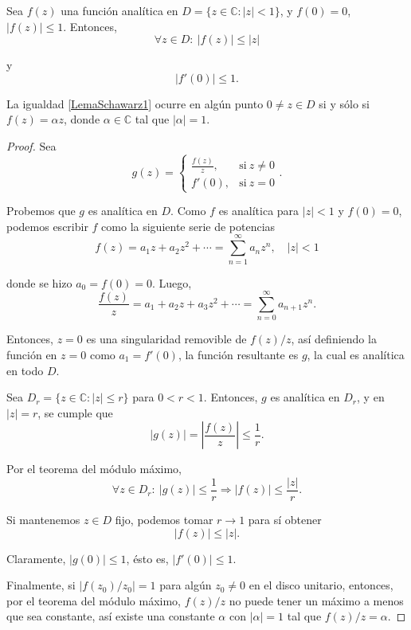 \begin{lema}[de Schwarz]
Sea $f(z)$ una función analítica en  $D = \{z \in \mathbb{C}: |z| < 1 \}$, y $f(0) = 0$, $|f(z)| \leq 1$. Entonces, 
\begin{equation}
 \forall z \in D:~ |f(z)| \leq |z|   \label{LemaSchawarz1}
\end{equation}

y
\begin{equation}
 |f'(0)| \leq 1. \label{LemaSchawarz2}
\end{equation}

La igualdad \eqref{LemaSchawarz1} ocurre en algún punto $0 \neq z \in D$ si y sólo si $f(z) =  \alpha z$, donde $\alpha \in \mathbb{C}$ tal que $|\alpha| = 1$.
\end{lema}
\begin{proof}

Sea 
$$g(z) = \left\{ \begin{array}{cl}
    \frac{f(z)}{z}, & \mbox{si}~ z\neq 0  \\
    f'(0), & \mbox{si}~ z = 0 
\end{array} \right. .$$

Probemos que $g$ es analítica en $D$. Como $f$ es analítica para  $|z| < 1$ y $f(0) = 0$, podemos escribir $f$ como la siguiente serie de potencias
$$f(z) = a_1z + a_2 z^2 + \cdots = \sum_{n=1}^{\infty} a_n z^n, \quad |z| < 1 $$

donde se hizo $a_0 = f(0) = 0$. Luego,
$$\frac{f(z)}{z} = a_1 + a_2 z + a_3 z^2 + \cdots = \sum_{n=0}^{\infty} a_{n+1} z^n.$$

Entonces, $z = 0$ es una singularidad removible de $f(z)/z$, así definiendo la función en $z = 0$ como $a_1 = f'(0)$, la función resultante es $g$, la cual es analítica en todo $D$. 

Sea $D_r = \{z \in \mathbb{C} : |z| \leq r\}$ para $0 <r <1$. Entonces, $g$ es analítica en $D_r$, y en $|z| = r$, se cumple que
$$|g(z)| = \left| \frac{f(z)}{z} \right| \leq \frac{1}{r}.$$

Por el teorema del módulo máximo,
$$\forall z \in D_r: ~ |g(z)| \leq \frac{1}{r} \Rightarrow |f(z)| \leq \frac{|z|}{r}.$$

Si mantenemos $z \in D$ fijo, podemos tomar  $r \to 1$ para sí obtener
$$|f(z)| \leq |z|.$$

Claramente, $|g(0)| \leq 1$, ésto es, $|f'(0)| \leq 1$.

Finalmente, si $|f(z_0)/z_0| = 1$ para algún $z_0 \neq 0$ en el disco unitario, entonces, por el teorema del módulo máximo, $f(z)/z$ no puede tener un máximo a menos que sea constante, así existe una constante $\alpha$ con $|\alpha| = 1$ tal que $f(z)/z = \alpha.$

\end{proof}

